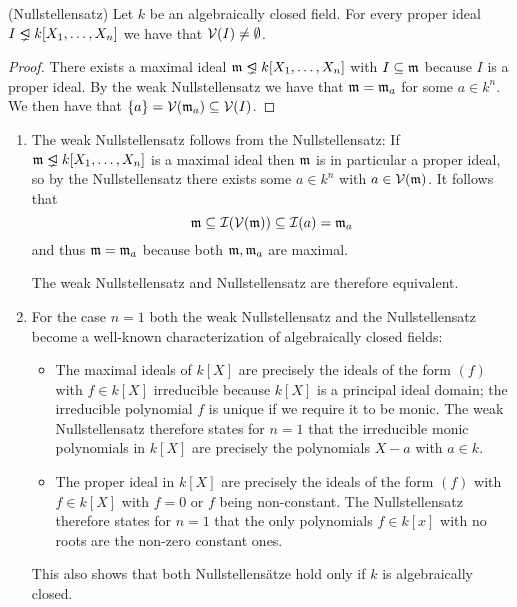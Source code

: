 \begin{theorem}(Nullstellensatz)
  \label{theorem: nullstellensatz}
  Let $k$ be an algebraically closed field.
  For every proper ideal $I \idealneq k[X_1, \dotsc, X_n]$ we have that $\mathcal{V}(I) \neq \emptyset$.
\end{theorem}


\begin{proof}
  There exists a maximal ideal $\mf{m} \idealneq k[X_1, \dotsc, X_n]$ with $I \subseteq \mathfrak{m}$ because $I$ is a proper ideal.
  By the weak Nullstellensatz we have that $\mathfrak{m} = \mathfrak{m}_a$ for some $a \in k^n$.
  We then have that $\{a\} = \mathcal{V}(\mathfrak{m}_a) \subseteq \mathcal{V}(I)$.
\end{proof}


\begin{remark}
  \label{remark: (weak) nullstellensatz}
  \leavevmode
  \begin{enumerate}
    \item
      \label{enumerate: WNS follows from NS}
      The weak Nullstellensatz follows from the Nullstellensatz:
      If $\mf{m} \idealneq k[X_1, \dotsc, X_n]$ is a maximal ideal then $\mathfrak{m}$ is in particular a proper ideal, so by the Nullstellensatz there exists some $a \in k^n$ with $a \in \mathcal{V}(\mathfrak{m})$.
      It follows that
      \[
                  \mathfrak{m}
        \subseteq \mathcal{I}(\mathcal{V}(\mathfrak{m}))
        \subseteq \mathcal{I}(a)
        =         \mathfrak{m}_a
      \]
      and thus $\mathfrak{m} = \mathfrak{m}_a$ because both $\mathfrak{m}, \mathfrak{m}_a$ are maximal.
      
      The weak Nullstellensatz and Nullstellensatz are therefore equivalent.
    \item
      For the case $n = 1$ both the weak Nullstellensatz and the Nullstellensatz become a well-known characterization of algebraically closed fields:
      \begin{itemize}
        \item
          The maximal ideals of $k[X]$ are precisely the ideals of the form $(f)$ with $f \in k[X]$ irreducible because $k[X]$ is a principal ideal domain;
          the irreducible polynomial $f$ is unique if we require it to be monic.
          The weak Nullstellensatz therefore states for $n = 1$ that the irreducible monic polynomials in $k[X]$ are precisely the polynomials $X - a$ with $a \in k$.
        \item
          The proper ideal in $k[X]$ are precisely the ideals of the form $(f)$ with $f \in k[X]$ with $f = 0$ or $f$ being non-constant.
          The Nullstellensatz therefore states for $n = 1$ that the only polynomials $f \in k[x]$ with no roots are the non-zero constant ones.
      \end{itemize}
      This also shows that both Nullstellensätze hold only if $k$ is algebraically closed.
      

\end{enumerate}
\end{remark}
